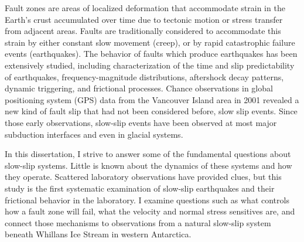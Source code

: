 \documentclass[11pt]{psuthesis}
\begin{document}
\begin{frontmatter}


\begin{doublespace}
\titlepage
\end{doublespace}

\committeepage

\abstract

Fault zones are areas of localized deformation that accommodate strain in the Earth's crust accumulated over time due to tectonic motion or stress transfer from adjacent areas. Faults are traditionally considered to accommodate this strain by either constant slow movement (creep), or by rapid catastrophic failure events (earthquakes). The behavior of faults which produce earthquakes has been extensively studied, including characterization of the time and slip predictability of earthquakes, frequency-magnitude distributions, aftershock decay patterns, dynamic triggering, and frictional processes. Chance observations in global positioning system (GPS) data from the Vancouver Island area in 2001 revealed a new kind of fault slip that had not been considered before, slow slip events. Since those early observations, slow-slip events have been observed at most major subduction interfaces and even in glacial systems. 

In this dissertation, I strive to answer some of the fundamental questions about slow-slip systems. Little is known about the dynamics of these systems and how they operate. Scattered laboratory observations have provided clues, but this study is the first systematic examination of slow-slip earthquakes and their frictional behavior in the laboratory. I examine questions such as what controls how a fault zone will fail, what the velocity and normal stress sensitives are, and connect those mechanisms to observations from a natural slow-slip system beneath Whillans Ice Stream in western Antarctica.


\end{frontmatter}
\end{document}
